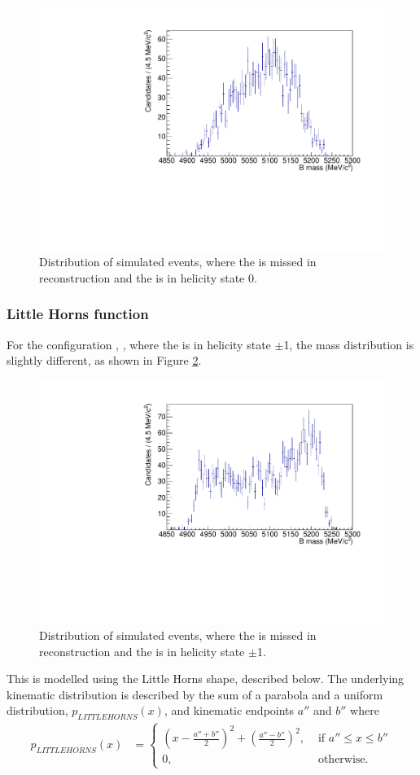 \begin{figure}[h]
\centering
\includegraphics[width=0.5\linewidth]{figures/fitComponents/hill.pdf}
\caption{Distribution of simulated \decay{\Bm}{(\decay{\Dstarz}{\Dz\gamma})\Kstarm} events, where the \Pgamma is missed in reconstruction and the \Dstarz is in helicity state 0.}
\label{fig:hill}
\end{figure}



\subsubsection{Little Horns function}

For the configuration \decay{\Bm}{\Dstarz\Kstarm}, \decay{\Dstarz}{\Dz\gamma}, where the \Dstarz is in helicity state $\pm$1, the \Bm mass distribution is slightly different, as shown in Figure \ref{fig:littlehorns}.

\begin{figure}[h]
\centering
\includegraphics[width=0.5\linewidth]{figures/fitComponents/littlehorns.pdf}
\caption{Distribution of simulated \decay{\Bm}{(\decay{\Dstarz}{\Dz\gamma})\Kstarm} events, where the \Pgamma is missed in reconstruction and the \Dstarz is in helicity state $\pm$1.}
\label{fig:littlehorns}
\end{figure}

This is modelled using the Little Horns shape, described below. The underlying kinematic distribution is described by the sum of a parabola and a uniform distribution, $p_{LITTLEHORNS}(x)$, and kinematic endpoints $a''$ and $b''$ where
\begin{align}
p_{LITTLEHORNS}(x) &= \begin{cases}
\left(x - \frac{a''+b''}{2}\right)^2 + \left(\frac{a''-b''}{2}\right)^2, & \text{ if $a'' \leq x \leq b''$}\\ 	
0, & \text{ otherwise.}
\end{cases} 
\end{align}

